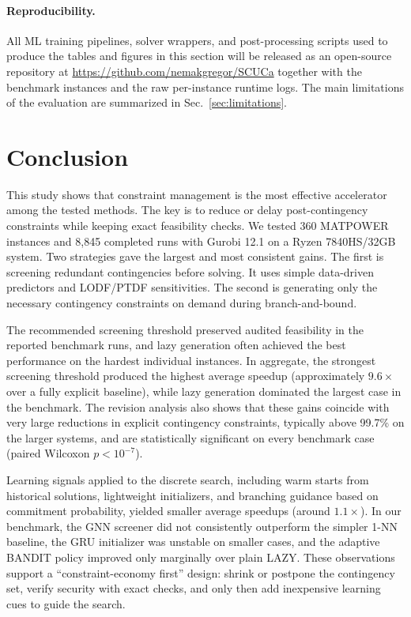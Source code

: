 \documentclass[runningheads]{llncs}
\begin{document}
\paragraph{Reproducibility.} All ML training pipelines, solver wrappers, and post-processing scripts used to produce the tables and figures in this section will be released as an open-source repository at \url{https://github.com/nemakgregor/SCUCa} together with the benchmark instances and the raw per-instance runtime logs. The main limitations of the evaluation are summarized in Sec.~\ref{sec:limitations}.

\section{Conclusion}

This study shows that constraint management is the most effective accelerator among the tested methods. The key is to reduce or delay post-contingency constraints while keeping exact feasibility checks. We tested 360 MATPOWER instances and 8,845 completed runs with Gurobi 12.1 on a Ryzen 7840HS/32GB system. Two strategies gave the largest and most consistent gains. The first is screening redundant contingencies before solving. It uses simple data-driven predictors and LODF/PTDF sensitivities. The second is generating only the necessary contingency constraints on demand during branch-and-bound.

The recommended screening threshold preserved audited feasibility in the reported benchmark runs, and lazy generation often achieved the best performance on the hardest individual instances. In aggregate, the strongest screening threshold produced the highest average speedup (approximately $9.6\times$ over a fully explicit baseline), while lazy generation dominated the largest case in the benchmark. The revision analysis also shows that these gains coincide with very large reductions in explicit contingency constraints, typically above 99.7\% on the larger systems, and are statistically significant on every benchmark case (paired Wilcoxon $p<10^{-7}$).

Learning signals applied to the discrete search, including warm starts from historical solutions, lightweight initializers, and branching guidance based on commitment probability, yielded smaller average speedups (around $1.1\times$). In our benchmark, the GNN screener did not consistently outperform the simpler 1-NN baseline, the GRU initializer was unstable on smaller cases, and the adaptive BANDIT policy improved only marginally over plain LAZY. These observations support a ``constraint-economy first'' design: shrink or postpone the contingency set, verify security with exact checks, and only then add inexpensive learning cues to guide the search.
\end{document}
